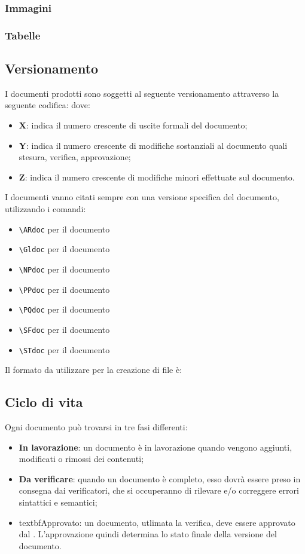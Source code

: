 		\subsubsection{Immagini}
		
		\subsubsection{Tabelle}
		
	
	\subsection{Versionamento}
	I documenti prodotti sono soggetti al seguente versionamento attraverso la seguente codifica:
	dove:
	\begin{itemize}
		\item \textbf{X}: indica il numero crescente di uscite formali del documento;
		\item \textbf{Y}: indica il numero crescente di modifiche sostanziali al documento quali stesura, verifica, approvazione;
		\item \textbf{Z}: indica il numero crescente di modifiche minori effettuate sul documento.
	\end{itemize}
	I documenti vanno citati sempre con una versione specifica del documento, utilizzando i comandi:
	\begin{itemize}
	\item \texttt{\textbackslash ARdoc} per il documento \ARdoc
	\item \texttt{\textbackslash Gldoc} per il documento \Gldoc
	\item \texttt{\textbackslash NPdoc} per il documento \NPdoc
	\item \texttt{\textbackslash PPdoc} per il documento \PPdoc
	\item \texttt{\textbackslash PQdoc} per il documento \PQdoc
	\item \texttt{\textbackslash SFdoc} per il documento \SFdoc
	\item \texttt{\textbackslash STdoc} per il documento \STdoc
	\end{itemize}
	Il formato da utilizzare per la creazione di file è:
	\subsection{Ciclo di vita}
	Ogni documento può trovarsi in tre fasi differenti:
	\begin{itemize}
		\item \textbf{In lavorazione}: un documento è in lavorazione quando vengono aggiunti, modificati o rimossi dei contenuti;
		\item \textbf{Da verificare}: quando un documento è completo, esso dovrà essere preso in consegna dai verificatori, che si occuperanno di rilevare e/o correggere errori sintattici e semantici;
		\item textbf{Approvato}: un documento, utlimata la verifica, deve essere approvato dal \RES. L'approvazione quindi determina lo stato finale della versione del documento.
		\end{itemize}